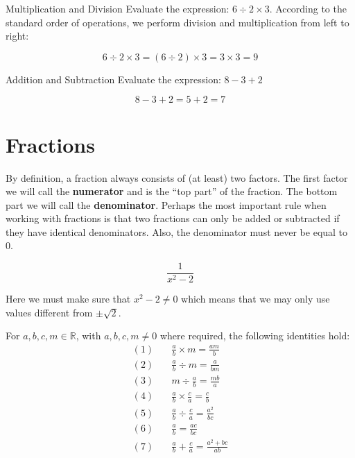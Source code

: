 \begin{example} Multiplication and Division \newline
Evaluate the expression: \(6 \div 2 \times 3\). According to the standard order of operations, we perform division and multiplication from left to right:

\[
6 \div 2 \times 3 = (6 \div 2) \times 3 = 3 \times 3 = 9
\]

\end{example}

\begin{example} Addition and Subtraction \newline
Evaluate the expression: \(8 - 3 + 2\)

\[
8 - 3 + 2 = 5 + 2 = 7
\]
\end{example}

\section{Fractions}
By definition, a fraction always consists of (at least) two factors. The first factor we will call the \textbf{numerator} and is the “top part” of the fraction. The bottom part we will call the \textbf{denominator}. Perhaps the most important rule when working with fractions is that two fractions can only be added or subtracted if they have identical denominators. Also, the denominator must never be equal to 0.

\begin{example}

\[
\frac{1}{x^2 - 2}
\]    
\end{example}

Here we must make sure that \(x^2 - 2 \neq 0\) which means that we may only use values different from \(\pm\sqrt{2}\).

\begin{proposition}
For $a,b,c,m \in \mathbb{R}$, with $a,b,c,m \neq 0$ where required, the following identities hold:
\begingroup
\setlength{\jot}{8pt} %
\begin{align*}
(1) & \quad \frac{a}{b} \times m = \frac{am}{b} \\
(2) & \quad \frac{a}{b} \div m = \frac{a}{bm} \\
(3) & \quad m \div \frac{a}{b} = \frac{mb}{a} \\
(4) & \quad \frac{a}{b} \times \frac{c}{a} = \frac{c}{b} \\
(5) & \quad \frac{a}{b} \div \frac{c}{a} = \frac{a^2}{bc} \\
(6) & \quad \frac{a}{b} = \frac{ac}{bc} \\
(7) & \quad \frac{a}{b} + \frac{c}{a} = \frac{a^2 + bc}{ab}
\end{align*}
\endgroup
\end{proposition}

